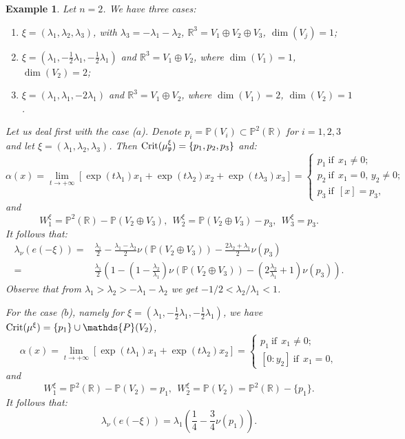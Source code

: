 \documentclass[leqno,11pt, a4]{amsart}
\newtheorem{Example}[equation]{Example}
\theoremstyle{named}
\begin{document}
\begin{Example}\rm
Let $n=2$. We have three cases:
\begin{enumerate}
\item[($a$)] $\xi=(\lambda_1,\lambda_2,\lambda_3)$, with $\lambda_3=-\lambda_1-\lambda_2$, $\mathds{R}^3=V_1\oplus V_2\oplus V_3$, $\dim(V_j)=1$;
\item[($b$)] $\xi=(\lambda_1,-\frac12\lambda_1,-\frac12\lambda_1)$ and $\mathds{R}^3=V_1\oplus V_2$, where $\dim(V_1)=1$, $\dim(V_2)=2$;
\item[($c$)]  $\xi=(\lambda_1,\lambda_1,-2\lambda_1)$ and $\mathds{R}^3=V_1\oplus V_2$, where $\dim(V_1)=2$, $\dim(V_2)=1$.
\end{enumerate}
Let us deal first with the case ($a$). Denote $p_i=\mathds{P}(V_i) \subset \mathds{P}^2 ({\mathbb{R}})$ for $i=1,2,3$ and let $\xi=(\lambda_1,\lambda_2,\lambda_3)$. Then ${\rm Crit}(\mu^\xi_{\mathfrak p})=\{p_1,p_2,p_3\}$ and:
\begin{equation}
 {\alpha}(x) =\lim_{t\to +\infty} [\exp(t\lambda_1)x_1+\exp(t\lambda_{2})x_{2}+\exp(t\lambda_{3})x_{3}]=\begin{cases} p_1\  {\textrm{if}}\ \ x_1\neq 0;\\
p_2\  {\textrm{if}}\ \ x_1=0,\, y_2\neq 0;\\
p_3\  {\textrm{if}}\ \ [x]=p_3,
 \end{cases}\nonumber
\end{equation}
and
$$
W_1^\xi=\mathds{P}^2(\mathds{R}){-} \mathds{P}(V_2\oplus V_3),\ \  W_2^\xi=\mathds{P}(V_2\oplus V_3){-} p_3,\ \ W_3^\xi=p_3.
$$
It follows that:
 \begin{equation}
\begin{split}
\lambda_\nu(e(-\xi))=&\frac{\lambda_1}2-\frac{\lambda_1-\lambda_2}2\nu (\mathds{P}(V_2\oplus V_3))-\frac{2\lambda_2+\lambda_1}2\nu (p_3)\\
=&\frac{\lambda_1}2\left(1-\left(1-\frac{\lambda_2}{\lambda_1}\right)\nu (\mathds{P}(V_2\oplus V_3))-\left(2\frac{\lambda_2}{\lambda_1}+1\right)\nu (p_3)\right).
\end{split}\nonumber
\end{equation}
Observe that from $\lambda_1>\lambda_2>-\lambda_1-\lambda_2$ we get $-1/2<{\lambda_2}/{\lambda_1}<1$.

For the case ($b$), namely for $\xi=(\lambda_1,-\frac12\lambda_1,-\frac12\lambda_1)$, we have ${\rm Crit}(\mu^\xi)=\{p_1\}\cup\mathds{P}(V_2)$,
\begin{equation}
 {\alpha}(x) =\lim_{t\to +\infty} [\exp(t\lambda_1)x_1+\exp(t\lambda_{2})x_{2}]=\begin{cases} p_1\  {\textrm{if}}\ \ x_1\neq 0;\\
[0:y_2]\  {\textrm{if}}\ \ x_1=0,
 \end{cases}\nonumber
\end{equation}
and
$$
W_1^\xi=\mathds{P}^2(\mathds{R}){-}\mathds{P}(V_2)=p_1,\ \  W_2^\xi=\mathds{P}(V_2)=\mathds{P}^2(\mathds{R}){-}\{p_1\}.
$$
It follows that:
$$
\lambda_\nu(e(-\xi))=\lambda_1\left(\frac{1}4-\frac{3}4\nu(p_1)\right).
$$


\end{Example}
\end{document}

